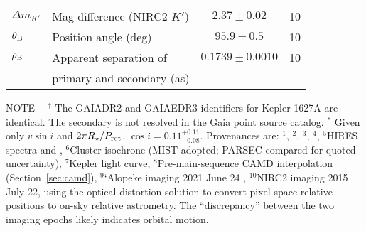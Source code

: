 \begin{table*}
\begin{tabular}{llcc}
$\Delta m_{K'}$ & Mag difference (NIRC2 $K'$)\dotfill & $2.37 \pm 0.02$ & 10 \\
$\theta_{\rm B}$ & Position angle (deg)\dotfill & $95.9 \pm 0.5$ & 10 \\
$\rho_{\rm B}$ & Apparent separation of \dotfill & $0.1739 \pm 0.0010$ &  10 \\
                    & \hspace{3pt} primary and secondary (as) &  \\
%
\hline
\end{tabular}
\begin{flushleft}
 \footnotesize{ \textsc{NOTE}---
 $^\dagger$ The GAIADR2 and GAIAEDR3 identifiers for Kepler 1627A are identical.  The secondary
 is not resolved in the Gaia point source catalog.
 $^*$ Given only $v\sin i$ and $2\pi R_\star/P_{\rm rot}$, $\cos i=0.11^{+0.11}_{-0.08}$.
Provenances are:
$^1$\citet{gaia_collaboration_2021_edr3},
$^2$\citet{stassun_TIC8_2019},
$^3$\citet{skrutskie_tmass_2006},
$^4$\citet{Lindegren_2021_offset},
$^5$HIRES spectra and \citet{yee_SM_2017},
$^6$Cluster isochrone (MIST adopted; PARSEC compared for quoted
  uncertainty),
$^7$Kepler light curve,
$^8$Pre-main-sequence CAMD interpolation (Section~\ref{sec:camd}),
$^9$`Alopeke imaging 2021 June 24 \citep{scott_twin_2021},
$^{10}$NIRC2 imaging 2015 July 22, using the \citet{yelda_2010} optical distortion solution to convert pixel-space relative positions to on-sky relative astrometry.
The ``discrepancy'' between the two imaging epochs likely indicates orbital motion.

}
\end{flushleft}
\vspace{-0.5cm}
\end{table*}
